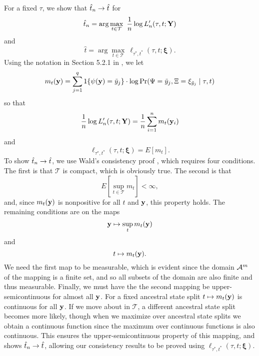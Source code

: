 For a fixed $\tau$, we show that $\hat{t}_n \rightarrow \hat{t}$ for
\[
\hat{t}_n = \arg\max_{t\in\mathcal{T}} \ \frac{1}{n}\log L_n'(\tau, t; \mathbf{Y})
\]
and
\[
\hat{t} = \arg\max_{t\in\mathcal{T}} \ \ell_{\tau^*,t^*}(\tau, t; \boldsymbol\xi).
\]
Using the notation in Section 5.2.1 in \citet{van1998asymptotic}, we let
\[
m_t(\mathbf{y}) = \sum_{j=1}^q 1\{\psi(\mathbf{y})=\tilde{y}_j\} \cdot \log \Pr(\Psi=\tilde{y}_j, \Xi=\xi_{\tilde{y}_j} \mid \tau, t)
\]
so that
\[
\frac{1}{n}\log L_n'(\tau, t; \mathbf{Y}) = \frac{1}{n} \sum_{i=1}^n m_t(\mathbf{y}_i)
\]
and
\[
\ell_{\tau^*,t^*}(\tau, t; \boldsymbol\xi) = E[m_t].
\]
To show $\hat{t}_n \rightarrow \hat{t}$, we use Wald's consistency proof \citep[p. 48, Theorem 5.14 of ][]{van1998asymptotic}, which requires four conditions.
The first is that $\mathcal{T}$ is compact, which is obviously true.
The second is that
\[
E\left[\sup_{t\in\mathcal{T}} m_t\right] < \infty,
\]
and, since $m_t(\mathbf{y})$ is nonpositive for all $t$ and $\mathbf{y}$, this property holds.
The remaining conditions are on the maps
\[
\mathbf{y} \mapsto \sup_t m_t(\mathbf{y})
\]
and
\[
t \mapsto m_t(\mathbf{y}).
\]
We need the first map to be measurable, which is evident since the domain $\mathcal{A}^m$ of the mapping is a finite set, and so all subsets of the domain are also finite and thus measurable.
Finally, we must have the the second mapping be upper-semicontinuous for almost all $\mathbf{y}$.
For a fixed ancestral state split $t \mapsto m_t(\mathbf{y})$ is continuous for all $\mathbf{y}$.
If we move about in $\mathcal{T}$, a different ancestral state split becomes more likely, though when we maximize over ancestral state splits we obtain a continuous function since the maximum over continuous functions is also continuous.
This ensures the upper-semicontinuous property of this mapping, and shows $\hat{t}_n \rightarrow \hat{t}$, allowing our consistency results to be proved using $\ell_{\tau^*,t^*}(\tau, t; \boldsymbol\xi)$.


